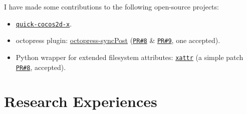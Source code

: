 \documentclass[letterpaper]{article}
\begin{document}
\begin{itemize}
\end{itemize}

I have made some contributions to the following open-source projects:
\begin{itemize}
    \item \href{https://github.com/dualface/v3quick}{\tt quick-cocos2d-x}.
    \item octopress plugin: \href{https://github.com/huangbowen521/octopress-syncPost}{octopress-syncPost} (\href{https://github.com/huangbowen521/octopress-syncPost/pull/8}{\tt PR\#8} \& \href{https://github.com/huangbowen521/octopress-syncPost/pull/9}{\tt PR\#9}, one accepted).
    \item Python wrapper for extended filesystem attributes: \href{https://github.com/xattr/xattr}{\tt xattr} (a simple patch \href{https://github.com/xattr/xattr/issues/8}{\tt PR\#8}, accepted).
\end{itemize}


\section*{Research Experiences}
\end{document}
